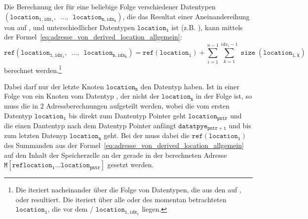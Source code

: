\begin{Special_Paragraph}
  Die Berechnung der  für eine beliebige Folge verschiedener Datentypen $(\mathtt{location_{1, idx_1},\enspace\ldots,\enspace location_{n, idx_n}})$, die das Resultat einer Aneinandereihung von  auf ,  und  unterschiedlicher Datentypen $\mathtt{location_{i}}$ ist (z.B. ), kann mittels der Formel~\ref{eq:adresse_von_derived_location_allgemein}:
  \begin{equation}
  \mathtt{ref(location_{1, idx_1},\enspace\ldots,\enspace location_{n, idx_n})} = \mathtt{ref(location_1)} + \sum_{i=1}^{n-1}\sum_{k=1}^{idx_i - 1} \mathtt{\operatorname{size}(location_{i, k})}
  \label{eq:adresse_von_derived_location_allgemein}
  \end{equation}
  berechnet werden.\footnote{Die  iteriert nacheinander über die Folge von Datentypen, die aus den  auf ,  oder  resultiert. Die  iteriert über alle  oder  des momentan betrachteten  $\mathtt{location_i}$, die vor dem  /  $\mathtt{location_{i, idx_i}}$ liegen.}

  Dabei darf nur der letzte Knoten $\mathtt{location_n}$ den Datentyp  haben. Ist in einer Folge von   ein Knoten vom Datentyp , der nicht der  $\mathtt{location_n}$ in der Folge ist, so muss die  in $2$ Adressberechnungen aufgeteilt werden, wobei die  vom ersten Datentyp $\mathtt{location_1}$ bis direkt zum Dantentyp Pointer geht $\mathtt{location_{pntr}}$ und die  einen Dantentyp nach dem Datentyp Pointer anfängt $\mathtt{datatpye_{pntr+1}}$ und bis zum letzten Datenyp $\mathtt{location_n}$ geht. Bei der  muss dabei die  $\mathtt{ref(location_1)}$ des Summanden aus der Formel~\ref{eq:adresse_von_derived_location_allgemein} auf den Inhalt der Speicherzelle an der gerade in der  berechneten Adresse $\mathtt{M\left[ref{location_1\ldots location_{pntr}}\right]}$ gesetzt werden.


\end{Special_Paragraph}
